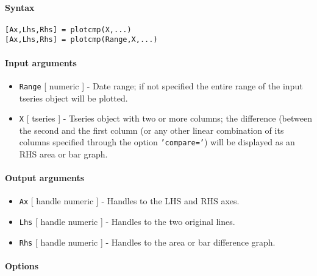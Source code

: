 


	\paragraph{Syntax}\label{syntax}

\begin{verbatim}
[Ax,Lhs,Rhs] = plotcmp(X,...)
[Ax,Lhs,Rhs] = plotcmp(Range,X,...)
\end{verbatim}

\paragraph{Input arguments}\label{input-arguments}

\begin{itemize}
\item
  \texttt{Range} {[} numeric {]} - Date range; if not specified the
  entire range of the input tseries object will be plotted.
\item
  \texttt{X} {[} tseries {]} - Tseries object with two or more columns;
  the difference (between the second and the first column (or any other
  linear combination of its columns specified through the option
  \texttt{'compare='}) will be displayed as an RHS area or bar graph.
\end{itemize}

\paragraph{Output arguments}\label{output-arguments}

\begin{itemize}
\item
  \texttt{Ax} {[} handle \textbar{} numeric {]} - Handles to the LHS and
  RHS axes.
\item
  \texttt{Lhs} {[} handle \textbar{} numeric {]} - Handles to the two
  original lines.
\item
  \texttt{Rhs} {[} handle \textbar{} numeric {]} - Handles to the area
  or bar difference graph.
\end{itemize}

\paragraph{Options}\label{options}

